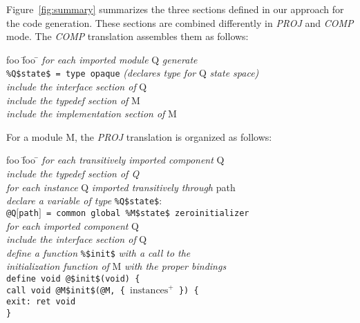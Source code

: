 \documentclass{llncs}
\newcommand{\llvm}[1]{\texttt{#1}}
\newcommand{\B}[1]{\textsf{#1}}
\newcommand{\ListOf}[1]{$\mbox{#1}^+$}
\begin{document}
Figure~\ref{fig:summary} summarizes the three sections defined in our approach
for the code generation. These sections are combined differently in
\emph{PROJ\/} and \emph{COMP\/} mode. The \emph{COMP\/} translation assembles
them as follows:
\begin{center}
  \begin{tabbing}
    foo \= foo \= \kill
    \textit{for each imported module} \B{Q} \textit{generate} \\
    \> \llvm{\%Q\$state\$ = type opaque} \quad \textit{(declares type for} \B{Q} \textit{state space)} \\
    \> \textit{include the interface section of }\B{Q} \\
    \textit{include the typedef section of} \B{M} \\
    \textit{include the implementation section of} \B{M}
  \end{tabbing}
\end{center}
For a module \B{M}, the \emph{PROJ\/} translation is organized as follows:
\begin{center}
  \begin{tabbing}
    foo \= foo \= \kill
    \textit{for each transitively imported component} \B{Q} \\
    \> \textit{include the typedef section of \B{Q}} \\
    \textit{for each instance} \B{Q} \textit{imported transitively through} \B{path} \\
    \> \textit{declare a variable of type} \llvm{\%Q\$state\$}: \\
    \> \llvm{@Q$\lbrack$path$\rbrack$ = common global \%M\$state\$ zeroinitializer} \\

    \textit{for each imported component} \B{Q} \\
    \> \textit{include the interface section of} \B{Q} \\
    \textit{define a function} \llvm{\%\$init\$} \textit{with a call to the } \\
    \> \textit{initialization function of} \B{M} \textit{with the proper bindings} \\
    \> \llvm{define void @\$init\$(void) \{} \\
    \> \> \llvm{call void @M\$init\$(@M, \{ \ListOf{instances} \}) \{} \\
    \> \> \llvm{exit: ret void} \\
    \> \llvm{\}} \\
    \>
  \end{tabbing}
\end{center}
\end{document}
